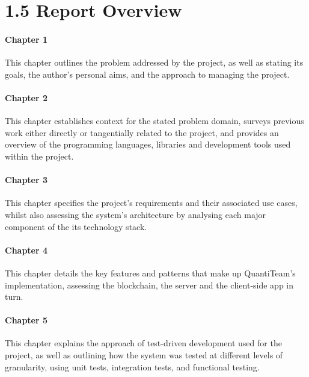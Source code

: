 \documentclass[12pt]{report}
\let\oldparagraph\paragraph
\renewcommand{\paragraph}[1]{\oldparagraph{#1}\mbox{}}
\begin{document}
\clearpage

\section{1.5 Report Overview}\label{report-overview}

\paragraph{Chapter 1}\label{chapter-1-1}

This chapter outlines the problem addressed by the project, as well as
stating its goals, the author's personal aims, and the approach to
managing the project.

\paragraph{Chapter 2}\label{chapter-2}

This chapter establishes context for the stated problem domain, surveys
previous work either directly or tangentially related to the project,
and provides an overview of the programming languages, libraries and
development tools used within the project.

\paragraph{Chapter 3}\label{chapter-3}

This chapter specifies the project's requirements and their associated
use cases, whilst also assessing the system's architecture by analysing
each major component of the its technology stack.

\paragraph{Chapter 4}\label{chapter-4}

This chapter details the key features and patterns that make up
QuantiTeam's implementation, assessing the blockchain, the server and
the client-side app in turn.

\paragraph{Chapter 5}\label{chapter-5}

This chapter explains the approach of test-driven development used for
the project, as well as outlining how the system was tested at different
levels of granularity, using unit tests, integration tests, and
functional testing.
\end{document}
